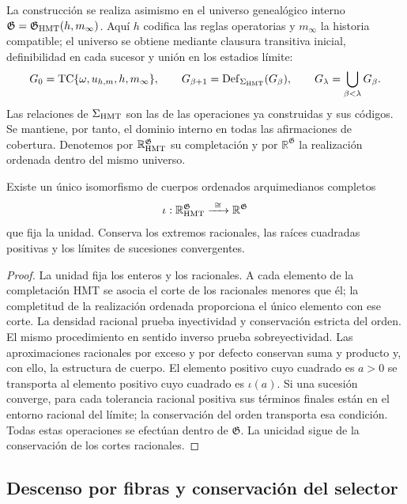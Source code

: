 La construcción se realiza asimismo en el universo genealógico interno
\(\mathfrak G=\mathfrak G_{\rm HMT}(h,m_\infty)\). Aquí \(h\) codifica
las reglas operatorias y \(m_\infty\) la historia compatible; el universo
se obtiene mediante clausura transitiva inicial, definibilidad en cada
sucesor y unión en los estadios límite:
\[
 G_0=\operatorname{TC}\{\omega,u_{h,m},h,m_\infty\},\qquad
 G_{\beta+1}=\operatorname{Def}_{\Sigma_{\rm HMT}}(G_\beta),\qquad
 G_\lambda=\bigcup_{\beta<\lambda}G_\beta .
\]
Las relaciones de \(\Sigma_{\rm HMT}\) son las de las operaciones ya
construidas y sus códigos. Se mantiene, por tanto, el dominio interno
en todas las afirmaciones de cobertura. Denotemos por
\(\mathbb R_{\rm HMT}^{\mathfrak G}\) su completación y por
\(\mathbb R^{\mathfrak G}\) la realización ordenada dentro del mismo
universo.

\begin{proposition}
\label{hmtfg:carta-interna}
Existe un único isomorfismo de cuerpos ordenados arquimedianos completos
\[
 \iota:\mathbb R_{\rm HMT}^{\mathfrak G}
             \xrightarrow{\ \cong\ }\mathbb R^{\mathfrak G}
\]
que fija la unidad. Conserva los extremos racionales, las raíces
cuadradas positivas y los límites de sucesiones convergentes.
\end{proposition}
\begin{proof}
La unidad fija los enteros y los racionales. A cada elemento de la
completación HMT se asocia el corte de los racionales menores que él;
la completitud de la realización ordenada proporciona el único elemento
con ese corte. La densidad racional prueba inyectividad y conservación
estricta del orden. El mismo procedimiento en sentido inverso prueba
sobreyectividad. Las aproximaciones racionales por exceso y por defecto
conservan suma y producto y, con ello, la estructura de cuerpo.
El elemento positivo cuyo cuadrado es \(a>0\) se transporta al elemento
positivo cuyo cuadrado es \(\iota(a)\). Si una sucesión converge, para
cada tolerancia racional positiva sus términos finales están en el
entorno racional del límite; la conservación del orden transporta esa
condición. Todas estas operaciones se efectúan dentro de
\(\mathfrak G\). La unicidad sigue de la conservación de los cortes
racionales.
\end{proof}

\subsection{Descenso por fibras y conservación del selector}
\label{hmtfg:descenso-selector}

